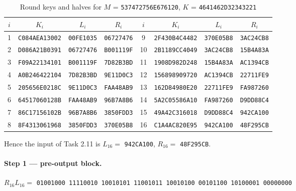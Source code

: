 \documentclass[12pt,a4paper]{article}
\begin{document}
\begin{table}[H]
\centering
\caption{Round keys and halves for $M$ = \texttt{537472756E676120}, $K$ = \texttt{4641462D32343221}}
\small
\begin{tabular}{cccc|cccc}
\toprule
$i$ & $K_i$ & $L_i$ & $R_i$ & $i$ & $K_i$ & $L_i$ & $R_i$ \\
\midrule
1 & \texttt{C084AEA13002} & \texttt{00FE1035} & \texttt{06727476} & 9  & \texttt{2F430B4C4482} & \texttt{370E05B8} & \texttt{3AC24CB8} \\
2 & \texttt{D086A21B0391} & \texttt{06727476} & \texttt{B001119F} & 10 & \texttt{2B1189CC4049} & \texttt{3AC24CB8} & \texttt{15B4A83A} \\
3 & \texttt{F09A22134101} & \texttt{B001119F} & \texttt{7D82B3BD} & 11 & \texttt{1908D982D248} & \texttt{15B4A83A} & \texttt{AC1394CB} \\
4 & \texttt{A0B246422104} & \texttt{7D82B3BD} & \texttt{9E11D0C3} & 12 & \texttt{156898909720} & \texttt{AC1394CB} & \texttt{22711FE9} \\
5 & \texttt{205656E0218C} & \texttt{9E11D0C3} & \texttt{FAA48AB9} & 13 & \texttt{162D84980E20} & \texttt{22711FE9} & \texttt{FA987260} \\
6 & \texttt{64517060128B} & \texttt{FAA48AB9} & \texttt{96B7A8B6} & 14 & \texttt{5A2C05586A10} & \texttt{FA987260} & \texttt{D9DD88C4} \\
7 & \texttt{86C17156102B} & \texttt{96B7A8B6} & \texttt{3850FDD3} & 15 & \texttt{49A42C316018} & \texttt{D9DD88C4} & \texttt{942CA100} \\
8 & \texttt{8F4313061968} & \texttt{3850FDD3} & \texttt{370E05B8} & 16 & \texttt{C1A4AC820E95} & \texttt{942CA100} & \texttt{48F295CB} \\
\bottomrule
\end{tabular}
\end{table}

Hence the input of Task 2.11 is $L_{16}=$ \texttt{942CA100}, $R_{16}=$ \texttt{48F295CB}.

\paragraph{Step 1 — pre-output block.}
\begin{center}\small
$R_{16}L_{16} =$ \texttt{01001000 11110010 10010101 11001011 10010100 00101100 10100001 00000000}
\end{center}
\end{document}
